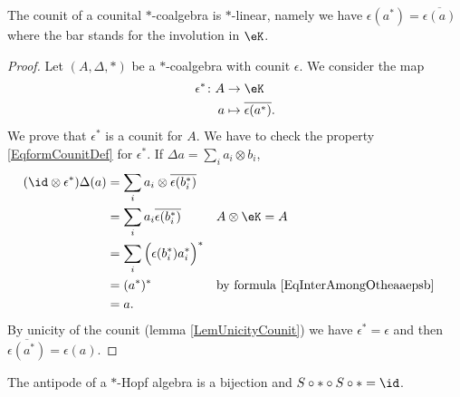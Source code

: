 \begin{lemma}       \label{LemcounitstarHopfalg}
    The counit of a counital \( *\)-coalgebra is \( *\)-linear, namely we have \( \epsilon(a^*)=\overline{ \epsilon(a) }\) where the bar stands for the involution in \( \eK\).
\end{lemma}

\begin{proof}
    Let \( (A,\Delta,*)\) be a \( *\)-coalgebra with counit \( \epsilon\). We consider the map
    \begin{equation}
        \begin{aligned}
            \epsilon^*\colon A&\to \eK \\
            a&\mapsto \overline{ \epsilon(a^*) }. 
        \end{aligned}
    \end{equation}
    We prove that $\epsilon^*$ is a counit for \( A\). We have to check the property \eqref{EqformCounitDef} for \( \epsilon^*\). If \( \Delta a=\sum_ia_i\otimes b_i\),
    \begin{equation}
        \begin{aligned}[]
            (\id\otimes\epsilon^*)\Delta(a)&=\sum_ia_i\otimes\overline{ \epsilon(b_i^*) }\\
            &=\sum_ia_i\overline{ \epsilon(b_i^*) }     &&\text{}A\otimes\eK=A\\
            &=\sum_i\Big( \epsilon(b_i^*)a_i^* \Big)^*\\
            &=(a^*)^*       &&\text{by formula \eqref{EqInterAmongOtheaaepsb}}\\
            &=a.
        \end{aligned}
    \end{equation}
    By unicity of the counit (lemma \ref{LemUnicityCounit}) we have \( \epsilon^*=\epsilon\) and then \( \overline{ \epsilon(a^*) }=\epsilon(a)\).
\end{proof}

\begin{theorem}
    The antipode of a $*$-Hopf algebra is a bijection and \( S\circ *\circ S\circ *=\id\).
\end{theorem}

